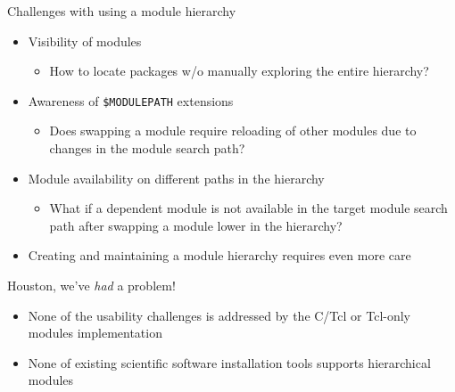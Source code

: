 \documentclass[10pt,xcolor={usenames,dvipsnames}]{beamer}
\begin{document}
\begin{frame}{Challenges with using a module hierarchy}
\begin{itemize}
    \item
        Visibility of modules
        \begin{itemize}
            \item
                How to locate packages w/o manually exploring the entire
                hierarchy?
        \end{itemize}
    \item
        Awareness of \texttt{\$MODULEPATH} extensions
        \begin{itemize}
            \item
                Does swapping a module require reloading of other modules due
                to changes in the module search path?
        \end{itemize}
    \item
        Module availability on different paths in the hierarchy
        \begin{itemize}
            \item
                What if a dependent module is not available in the target
                module search path after swapping a module lower in the
                hierarchy?
        \end{itemize}
    \item
        Creating and maintaining a module hierarchy requires even more care
\end{itemize}
\begin{center}
    \begin{minipage}{0.9\textwidth}
        \begin{alertblock}{Houston, we've \emph{had} a problem!}
            \footnotesize
            \begin{itemize}
                \item
                    None of the usability challenges is addressed by the
                    C/Tcl or Tcl-only modules implementation
                \item
                    None of existing scientific software installation tools
                    supports hierarchical modules
            \end{itemize}
        \end{alertblock}
    \end{minipage}
\end{center}
\end{frame}
\end{document}
